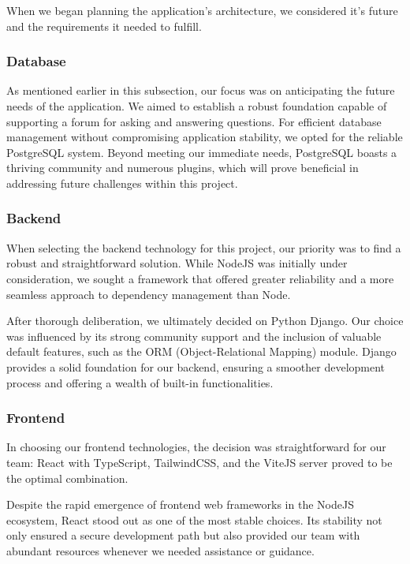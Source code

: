 \documentclass[12pt,a4paper]{article}
\begin{document}
\begin{spacing}{1.5}
    When we began planning the application's architecture, we considered it's
    future and the requirements it needed to fulfill.

    \subsubsection{Database}
    As mentioned earlier in this subsection, our focus was on anticipating the
    future needs of the application. We aimed to establish a robust foundation
    capable of supporting a forum for asking and answering questions. For efficient
    database management without compromising application stability, we opted for
    the reliable PostgreSQL system. Beyond meeting our immediate needs, PostgreSQL
    boasts a thriving community and numerous plugins, which will prove beneficial
    in addressing future challenges within this project.

    \subsubsection{Backend}
    When selecting the backend technology for this project, our priority was to
    find a robust and straightforward solution. While NodeJS was initially under
    consideration, we sought a framework that offered greater reliability and a
    more seamless approach to dependency management than Node.

    After thorough deliberation, we ultimately decided on Python Django. Our choice
    was influenced by its strong community support and the inclusion of valuable
    default features, such as the ORM (Object-Relational Mapping) module. Django
    provides a solid foundation for our backend, ensuring a smoother development
    process and offering a wealth of built-in functionalities.

    \subsubsection{Frontend}
    In choosing our frontend technologies, the decision was straightforward for our
    team: React with TypeScript, TailwindCSS, and the ViteJS server proved to be
    the optimal combination.

    Despite the rapid emergence of frontend web frameworks in the NodeJS ecosystem,
    React stood out as one of the most stable choices. Its stability not only
    ensured a secure development path but also provided our team with abundant
    resources whenever we needed assistance or guidance.


\end{spacing}
\end{document}
